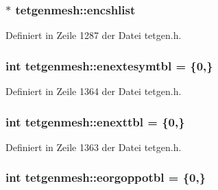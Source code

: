\hypertarget{classtetgenmesh_a8680cdcf4cd31d633e31900455694208}{
\subsubsection[{encshlist}]{ $\ast$ tetgenmesh\-::encshlist}}\label{classtetgenmesh_a8680cdcf4cd31d633e31900455694208}


Definiert in Zeile 1287 der Datei tetgen.\-h.

\hypertarget{classtetgenmesh_a786d6315851349b63d53f1eb8a1fcef1}{
\subsubsection[{enextesymtbl}]{\setlength{\rightskip}{0pt plus 5cm}int tetgenmesh\-::enextesymtbl = \{0,\}\hspace{0.3cm}{\ttfamily [static]}}}\label{classtetgenmesh_a786d6315851349b63d53f1eb8a1fcef1}


Definiert in Zeile 1364 der Datei tetgen.\-h.

\hypertarget{classtetgenmesh_afc8cb9e38dc9efd6c4903b00679d693e}{
\subsubsection[{enexttbl}]{\setlength{\rightskip}{0pt plus 5cm}int tetgenmesh\-::enexttbl = \{0,\}\hspace{0.3cm}{\ttfamily [static]}}}\label{classtetgenmesh_afc8cb9e38dc9efd6c4903b00679d693e}


Definiert in Zeile 1363 der Datei tetgen.\-h.

\hypertarget{classtetgenmesh_a7c43767f721d455559988e2f168ff4b2}{
\subsubsection[{eorgoppotbl}]{\setlength{\rightskip}{0pt plus 5cm}int tetgenmesh\-::eorgoppotbl = \{0,\}\hspace{0.3cm}{\ttfamily [static]}}}\label{classtetgenmesh_a7c43767f721d455559988e2f168ff4b2}


